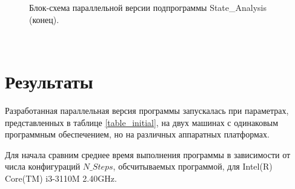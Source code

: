 \documentclass[14pt,a4paper,report]{ncc}
\begin{document}
\begin{figure}[p]
\caption{Блок-схема параллельной версии подпрограммы State\_Analysis (конец).}
\label{ris:image6}
\end{figure}
\

\newpage
\chapter*{Результаты}
Разработанная параллельная версия программы запускалась при параметрах, представленных в таблице \ref{table_initial}, на двух машинах с одинаковым программным обеспечением, но на различных аппаратных платформах. 
\

Для начала сравним среднее время выполнения программы в зависимости от числа конфигураций $N\_Steps$, обсчитываемых программой, для Intel(R) Core(TM) i3-3110M 2.40GHz.
\
\end{document}
